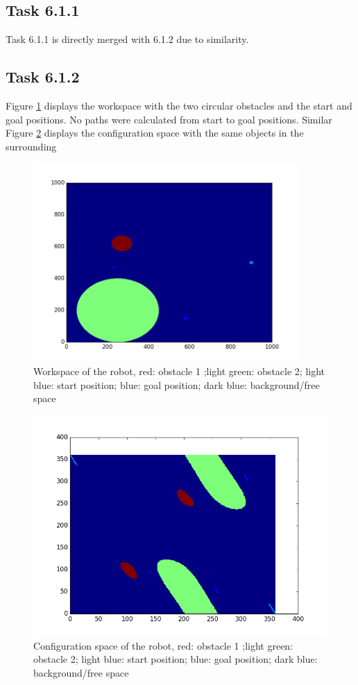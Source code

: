 \subsection*{Task 6.1.1}

Task 6.1.1 is directly merged with 6.1.2 due to similarity.

\subsection*{Task 6.1.2}

Figure \ref{fig:wspace} displays the workspace with the two circular obstacles and the start and goal positions. No paths were calculated from start to goal positions.
Similar Figure \ref{fig:cspace} displays the configuration space with the same objects in the surrounding
\begin{figure}[h]
	\includegraphics[width=0.9\textwidth ,height=0.94\textwidth]{Wspace.png}
	\caption{Workspace of the robot, red: obstacle 1 ;light green: obstacle 2; light blue: start position; blue: goal position; dark blue: background/free space}
	\label{fig:wspace}
\end{figure}

\begin{figure}[h]
	\includegraphics[scale=0.7]{Cspace.png}
	\caption{Configuration space of the robot, red: obstacle 1 ;light green: obstacle 2; light blue: start position; blue: goal position; dark blue: background/free space}
	\label{fig:cspace}
\end{figure}



